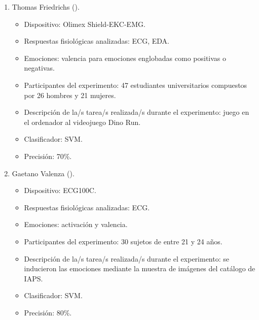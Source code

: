 \begin{enumerate}
    \item Thomas Friedrichs (\citeyear{friedrichs2015simple}).
    \begin{itemize}
        \item Dispositivo: Olimex Shield-EKC-EMG.
        \item Respuestas fisiológicas analizadas: ECG, EDA.
        \item Emociones: valencia para emociones englobadas como positivas o negativas.
        \item Participantes del experimento: 47 estudiantes universitarios compuestos por 26 hombres y 21 mujeres.
        \item Descripción de la/s tarea/s realizada/s durante el experimento: juego en el ordenador al videojuego Dino Run.
        \item Clasificador: SVM.
        \item Precisión: 70\%.
    \end{itemize}

    \item Gaetano Valenza (\citeyear{valenza2014revealing}).
    \begin{itemize}
        \item Dispositivo: ECG100C.
        \item Respuestas fisiológicas analizadas: ECG.
        \item Emociones: activación y valencia.
        \item Participantes del experimento: 30 sujetos de entre 21 y 24 años.
        \item Descripción de la/s tarea/s realizada/s durante el experimento: se inducieron las emociones mediante la muestra de imágenes del catálogo de IAPS.       
        \item Clasificador: SVM.
        \item Precisión: 80\%.
    \end{itemize}


\end{enumerate}
